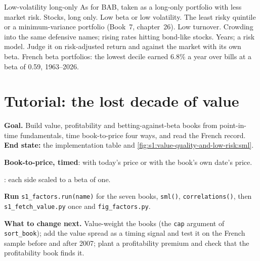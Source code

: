 \begin{strategyfile}{Low-volatility long-only}\label{strat:s1:value-quality-and-low-risk:lowvol}
 As for BAB, taken as a long-only portfolio with less market risk.
 Stocks, long only.
 Low beta or low volatility.
 The least risky quintile or a minimum-variance portfolio (Book~7, chapter~26).
 Low turnover.
 Crowding into the same defensive names; rising rates hitting bond-like stocks.
 Years; a risk model.
 Judge it on risk-adjusted return and against the market with its own beta.
 French beta portfolios: the lowest decile earned 6.8\% a year over bills at a beta of 0.59, 1963--2026.
\end{strategyfile}

\section{Tutorial: the lost decade of value}\label{tut:s1:value-quality-and-low-risk:tut}

\begin{tutorial}
\textbf{Goal.} Build value, profitability and betting-against-beta books from point-in-time fundamentals, time book-to-price four ways, and read the French
record. \textbf{End state:} the implementation table and \cref{fig:s1:value-quality-and-low-risk:sml}.
\begin{tutsteps}
\item \textbf{Book-to-price, timed}: with today's price or with the book's own date's price.
\label{lst:s1:value-quality-and-low-risk:bp}
\item \textbf{}: each side scaled to a beta of one.
\label{lst:s1:value-quality-and-low-risk:bab}
\item \textbf{Run} \texttt{s1\_factors.run(name)} for the seven books, \texttt{sml()}, \texttt{correlations()}, then \texttt{s1\_fetch\_value.py} once and
\texttt{fig\_factors.py}.
\end{tutsteps}
\textbf{What to change next.} Value-weight the books (the \texttt{cap} argument of \texttt{sort\_book}); add the value spread as a timing signal and test it on the French
sample before and after 2007; plant a profitability premium and check that the profitability book finds it.
\end{tutorial}

